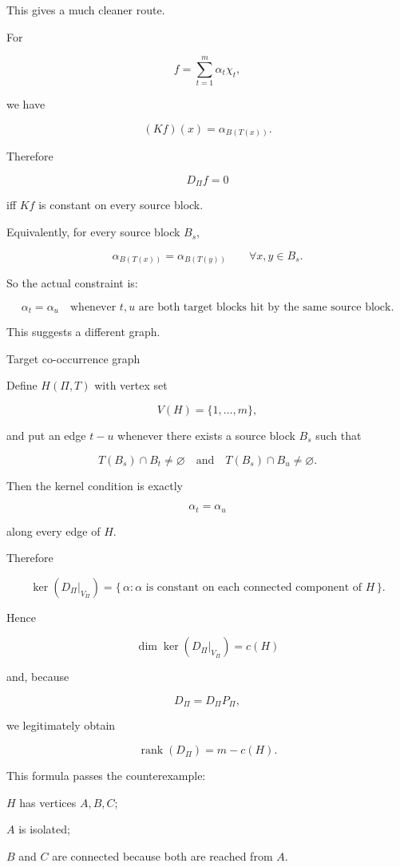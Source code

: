 This gives a much cleaner route.

For

\[
f=\sum_{t=1}^m\alpha_t\chi_t,  
\]

we have

\[
(Kf)(x)=\alpha_{B(T(x))}.  
\]

Therefore

\[
D_\Pi f=0  
\]

iff \(Kf\) is constant on every source block.

Equivalently, for every source block \(B_s\),

\[
\alpha_{B(T(x))}  
=  
\alpha_{B(T(y))}  
\qquad  
\forall x,y\in B_s.  
\]

So the actual constraint is:

\[
\boxed{  
\alpha_t=\alpha_u  
\quad\text{whenever }t,u  
\text{ are both target blocks hit by the same source block}.  
}  
\]

This suggests a different graph.

Target co-occurrence graph

Define \(H(\Pi,T)\) with vertex set

\[
V(H)=\{1,\ldots,m\},  
\]

and put an edge \(t-u\) whenever there exists a source block \(B_s\) such that

\[
T(B_s)\cap B_t\neq\varnothing  
\quad\text{and}\quad  
T(B_s)\cap B_u\neq\varnothing.  
\]

Then the kernel condition is exactly

\[
\alpha_t=\alpha_u  
\]

along every edge of \(H\).

Therefore

\[
\ker(D_\Pi|_{V_\Pi})  
=  
\{\,\alpha:\alpha\text{ is constant on each connected component of }H\,\}.  
\]

Hence

\[
\boxed{  
\dim\ker(D_\Pi|_{V_\Pi})  
=  
c(H)  
}  
\]

and, because

\[
D_\Pi=D_\Pi P_\Pi,  
\]

we legitimately obtain

\[
\boxed{  
\operatorname{rank}(D_\Pi)  
=  
m-c(H).  
}  
\]

This formula passes the counterexample:

\(H\) has vertices \(A,B,C\);

\(A\) is isolated;

\(B\) and \(C\) are connected because both are reached from \(A\).

